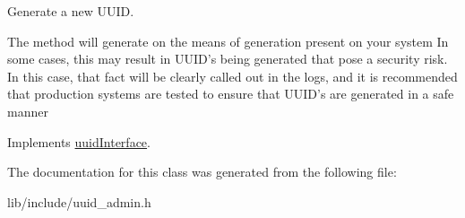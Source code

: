 Generate a new U\-U\-I\-D. 

The method will generate on the means of generation present on your system In some cases, this may result in U\-U\-I\-D's being generated that pose a security risk. In this case, that fact will be clearly called out in the logs, and it is recommended that production systems are tested to ensure that U\-U\-I\-D's are generated in a safe manner 

Implements \hyperlink{classuuidInterface_ae1696692de5b139246154c8d32d44797}{uuid\-Interface}.



The documentation for this class was generated from the following file\-:\begin{DoxyCompactItemize}
\item 
lib/include/uuid\-\_\-admin.\-h\end{DoxyCompactItemize}
